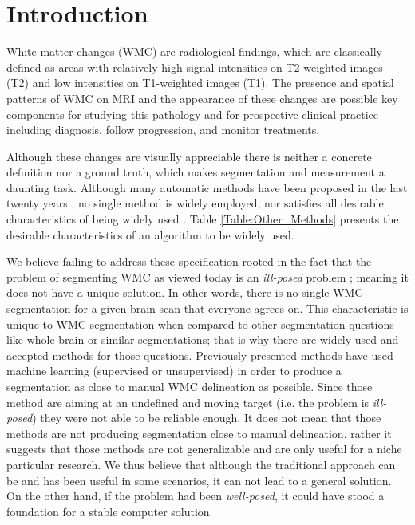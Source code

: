 \section{Introduction} \label{intro}


White matter changes (WMC) are radiological findings, which are classically defined as areas with relatively high signal intensities on T2-weighted images (T2) and low intensities on T1-weighted images (T1). The presence and spatial patterns of WMC on MRI and the appearance of these changes are possible key components for studying this pathology and for prospective clinical practice including diagnosis, follow progression, and monitor treatments.

Although these changes are visually appreciable there is neither a concrete definition nor a ground truth, which makes segmentation and measurement a daunting task. Although many automatic methods have been proposed in the last twenty years \cite{Kamber_1995,Udupa_1997,Boudraa2000,Zijdenbos_2002,LesionTOADS_2010,OutlierLocalIntensity_2011,CascadeOrig,LesionSegmentationToolbox_2012,kNN-TTPs_2013,Rotation-invariant_2015}; no single method is widely employed, nor satisfies all desirable characteristics of being widely used \cite{GarciaReview}. Table \ref{Table:Other_Methods} presents the desirable characteristics of an algorithm to be widely used.



We believe failing to address these specification rooted in the fact that the problem of segmenting WMC as viewed today is an \textit{ill-posed} problem \cite{IllPosed}; meaning it does not have a unique solution. In other words, there is no single WMC segmentation for a given brain scan that everyone agrees on. This characteristic is unique to WMC segmentation when compared to other segmentation questions like whole brain or similar segmentations; that is why there are widely used and accepted methods for those questions. Previously presented methods have used machine learning (supervised or unsupervised) in order to produce a segmentation as close to manual WMC delineation as possible. Since those method are aiming at an undefined and moving target (i.e. the problem is \textit{ill-posed}) they were not able to be reliable enough. It does not mean that those methods are not producing segmentation close to manual delineation, rather it suggests that those methods are not generalizable and are only useful for a niche particular research. We thus believe that although the traditional approach can be and has been useful in some scenarios, it can not lead to a general solution. On the other hand, if the problem had been \textit{well-posed}, it could have stood a foundation for a stable computer solution.

